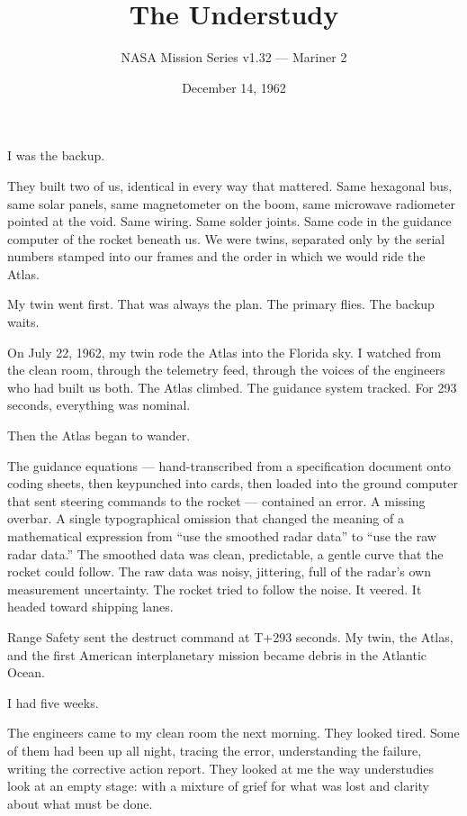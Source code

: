 \documentclass[12pt,letterpaper]{article}
\title{\textbf{The Understudy}}
\author{NASA Mission Series v1.32 --- Mariner 2}
\date{December 14, 1962}
\begin{document}
\maketitle
\onehalfspacing

\noindent I was the backup.

They built two of us, identical in every way that mattered. Same hexagonal bus, same solar panels, same magnetometer on the boom, same microwave radiometer pointed at the void. Same wiring. Same solder joints. Same code in the guidance computer of the rocket beneath us. We were twins, separated only by the serial numbers stamped into our frames and the order in which we would ride the Atlas.

My twin went first. That was always the plan. The primary flies. The backup waits.

On July 22, 1962, my twin rode the Atlas into the Florida sky. I watched from the clean room, through the telemetry feed, through the voices of the engineers who had built us both. The Atlas climbed. The guidance system tracked. For 293 seconds, everything was nominal.

Then the Atlas began to wander.

The guidance equations --- hand-transcribed from a specification document onto coding sheets, then keypunched into cards, then loaded into the ground computer that sent steering commands to the rocket --- contained an error. A missing overbar. A single typographical omission that changed the meaning of a mathematical expression from ``use the smoothed radar data'' to ``use the raw radar data.'' The smoothed data was clean, predictable, a gentle curve that the rocket could follow. The raw data was noisy, jittering, full of the radar's own measurement uncertainty. The rocket tried to follow the noise. It veered. It headed toward shipping lanes.

Range Safety sent the destruct command at T+293 seconds. My twin, the Atlas, and the first American interplanetary mission became debris in the Atlantic Ocean.

I had five weeks.

\bigskip

The engineers came to my clean room the next morning. They looked tired. Some of them had been up all night, tracing the error, understanding the failure, writing the corrective action report. They looked at me the way understudies look at an empty stage: with a mixture of grief for what was lost and clarity about what must be done.
\end{document}
